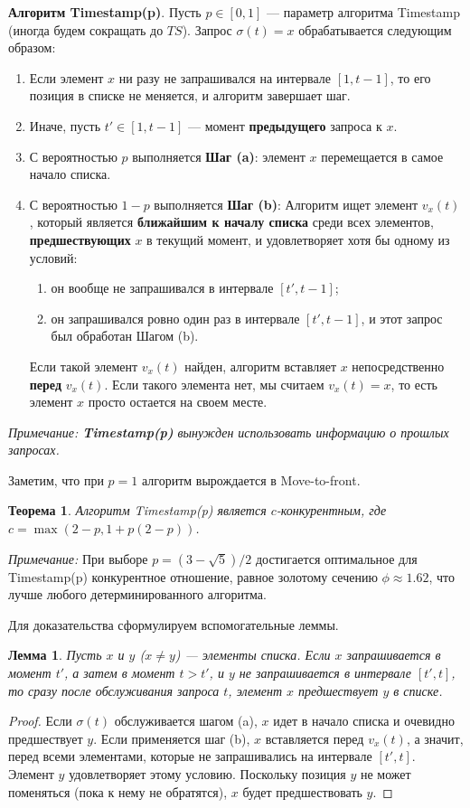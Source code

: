 \documentclass[12pt, a4paper]{article}
\newtheorem{theorem}{Теорема}
\newtheorem{lemma}{Лемма}
\begin{document}
\textbf{Алгоритм Timestamp(p)}. Пусть $p \in [0, 1]$ --- параметр алгоритма Timestamp (иногда будем сокращать до $TS$). Запрос $\sigma(t) = x$ обрабатывается следующим образом:

\begin{enumerate}
    \item Если элемент $x$ ни разу не запрашивался на интервале $[1, t-1]$, то его позиция в списке не меняется, и алгоритм завершает шаг.
    \item Иначе, пусть $t' \in [1, t-1]$ --- момент \textbf{предыдущего} запроса к $x$.
    \item С вероятностью $p$ выполняется \textbf{Шаг (a)}: элемент $x$ перемещается в самое начало списка.
    \item С вероятностью $1-p$ выполняется \textbf{Шаг (b)}:
    Алгоритм ищет элемент $v_x(t)$, который является \textbf{ближайшим к началу списка} среди всех элементов, \textbf{предшествующих} $x$ в текущий момент, и удовлетворяет хотя бы одному из условий:
    \begin{enumerate}
        \item[i)] он вообще не запрашивался в интервале $[t', t-1]$;
        \item[ii)] он запрашивался ровно один раз в интервале $[t', t-1]$, и этот запрос был обработан Шагом (b).
    \end{enumerate}
    Если такой элемент $v_x(t)$ найден, алгоритм вставляет $x$ непосредственно \textbf{перед} $v_x(t)$. Если такого элемента нет, мы считаем $v_x(t) = x$, то есть элемент $x$ просто остается на своем месте.
\end{enumerate}

\textit{Примечание: \textbf{Timestamp(p)} вынужден использовать информацию о прошлых запросах.}

Заметим, что при $p=1$ алгоритм вырождается в Move-to-front. 

\begin{theorem}
Алгоритм Timestamp(p) является $c$-конкурентным, где $c = \max(2 - p, 1 + p(2 - p))$.
\end{theorem}
\textit{Примечание:} При выборе $p = (3-\sqrt{5})/2$ достигается оптимальное для Timestamp(p) конкурентное отношение, равное золотому сечению $\phi \approx 1.62$, что лучше любого детерминированного алгоритма.

Для доказательства сформулируем вспомогательные леммы.

\begin{lemma}
Пусть $x$ и $y$ ($x \neq y$) --- элементы списка. Если $x$ запрашивается в момент $t'$, а затем в момент $t > t'$, и $y$ не запрашивается в интервале $[t', t]$, то сразу после обслуживания запроса $t$, элемент $x$ предшествует $y$ в списке.
\end{lemma}
\begin{proof}
Если $\sigma(t)$ обслуживается шагом (a), $x$ идет в начало списка и очевидно предшествует $y$. Если применяется шаг (b), $x$ вставляется перед $v_x(t)$, а значит, перед всеми элементами, которые не запрашивались на интервале $[t', t]$. Элемент $y$ удовлетворяет этому условию. Поскольку позиция $y$ не может поменяться (пока к нему не обратятся), $x$ будет предшествовать $y$.
\end{proof}
\end{document}
